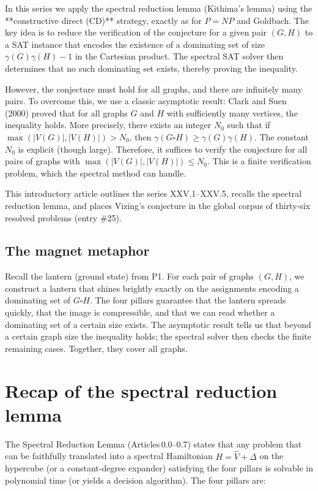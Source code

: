 \documentclass[11pt,a4paper]{article}
\begin{document}
In this series we apply the spectral reduction lemma (Kithima's lemma) using the **constructive direct (CD)** strategy, exactly as for $P=NP$ and Goldbach. The key idea is to reduce the verification of the conjecture for a given pair $(G,H)$ to a SAT instance that encodes the existence of a dominating set of size $\gamma(G)\gamma(H)-1$ in the Cartesian product. The spectral SAT solver then determines that no such dominating set exists, thereby proving the inequality.

However, the conjecture must hold for all graphs, and there are infinitely many pairs. To overcome this, we use a classic asymptotic result: Clark and Suen (2000) proved that for all graphs $G$ and $H$ with sufficiently many vertices, the inequality holds. More precisely, there exists an integer $N_0$ such that if $\max(|V(G)|,|V(H)|) > N_0$, then $\gamma(G\square H) \ge \gamma(G)\gamma(H)$. The constant $N_0$ is explicit (though large). Therefore, it suffices to verify the conjecture for all pairs of graphs with $\max(|V(G)|,|V(H)|) \le N_0$. This is a finite verification problem, which the spectral method can handle.

This introductory article outlines the series XXV.1–XXV.5, recalls the spectral reduction lemma, and places Vizing's conjecture in the global corpus of thirty‑six resolved problems (entry \#25).

\subsection*{The magnet metaphor}

Recall the lantern (ground state) from P1. For each pair of graphs $(G,H)$, we construct a lantern that shines brightly exactly on the assignments encoding a dominating set of $G\square H$. The four pillars guarantee that the lantern spreads quickly, that the image is compressible, and that we can read whether a dominating set of a certain size exists. The asymptotic result tells us that beyond a certain graph size the inequality holds; the spectral solver then checks the finite remaining cases. Together, they cover all graphs.

\section{Recap of the spectral reduction lemma}

The Spectral Reduction Lemma (Articles 0.0–0.7) states that any problem that can be faithfully translated into a spectral Hamiltonian $H = \hat{V} + \Delta$ on the hypercube (or a constant‑degree expander) satisfying the four pillars is solvable in polynomial time (or yields a decision algorithm). The four pillars are:
\end{document}
